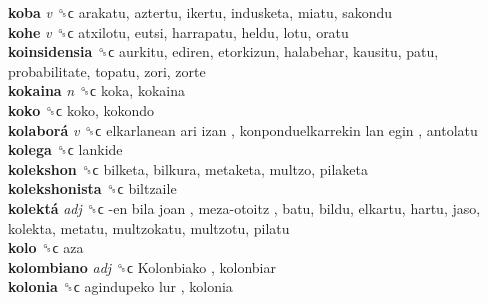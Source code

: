 \textbf{koba} \emph{v}  ␝ϲ  arakatu, aztertu, ikertu, indusketa, miatu, sakondu  \\
\textbf{kohe} \emph{v}  ␝ϲ  atxilotu, eutsi, harrapatu, heldu, lotu, oratu  \\
\textbf{koinsidensia} ␝ϲ  aurkitu, ediren, etorkizun, halabehar, kausitu, patu, probabilitate, topatu, zori, zorte  \\
\textbf{kokaina} \emph{n}  ␝ϲ  koka, kokaina  \\
\textbf{koko} ␝ϲ  koko, kokondo  \\
\textbf{kolaborá} \emph{v}  ␝ϲ   elkarlanean ari izan ,  konponduelkarrekin lan egin , antolatu  \\
\textbf{kolega} ␝ϲ  lankide  \\
\textbf{kolekshon} ␝ϲ  bilketa, bilkura, metaketa, multzo, pilaketa  \\
\textbf{kolekshonista} ␝ϲ  biltzaile  \\
\textbf{kolektá} \emph{adj}  ␝ϲ   -en bila joan ,  meza-otoitz , batu, bildu, elkartu, hartu, jaso, kolekta, metatu, multzokatu, multzotu, pilatu  \\
\textbf{kolo} ␝ϲ  aza  \\
\textbf{kolombiano} \emph{adj}  ␝ϲ   Kolonbiako , kolonbiar  \\
\textbf{kolonia} ␝ϲ   agindupeko lur , kolonia  \\
